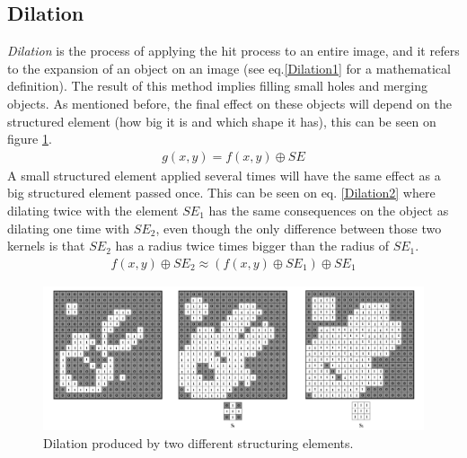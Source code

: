 \subsection{Dilation}
\textit{Dilation} is the process of applying the hit process to an entire image, and it refers to the expansion of an object on an image (see eq.\ref{Dilation1} for a mathematical definition). The result of this method implies filling small holes and merging objects. As mentioned before, the final effect on these objects will depend on the structured element (how big it is and which shape it has), this can be seen on figure \ref{fig:Dilation}. 
\begin{equation}
\begin{aligned}
{g(x, y)}={f(x,y)}\oplus{SE}
\label{Dilation1}
	\end{aligned}
\end{equation}
A small structured element applied several times will have the same effect as a big structured element passed once. This can be seen on eq. \ref{Dilation2} where dilating twice with the element {$SE_{1}$} has the same consequences on the object as dilating one time with {$SE_{2}$}, even though the only difference between those two kernels is that {$SE_{2}$} has a radius twice times bigger than the radius of {$SE_{1}$}.
\begin{equation}
\begin{aligned}
{f(x,y)}\oplus{SE_{2}} \approx ({f(x,y)}\oplus{SE_{1}})\oplus{SE_{1}}
\label{Dilation2}
	\end{aligned}
\end{equation}
\begin{figure}[htbp]
\centering
\includegraphics[width=1\textwidth]{Pictures/Theory/Dilation.png}
\caption{Dilation produced by two different structuring elements.}
\label{fig:Dilation}
\end{figure}

